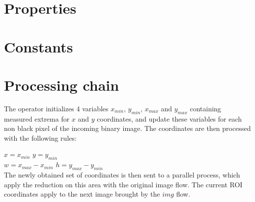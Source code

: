 \documentclass[12pt,a4paper]{article}
\begin{document}
\section*{Properties}

\vspace{0.5cm}

\section*{Constants}



\section*{Processing chain}

The operator initializes 4 variables $x_{min}$, $y_{min}$, $x_{max}$ and $y_{max}$ containing measured extrema for $x$ and $y$ coordinates, and update these variables for each non black pixel of the incoming binary image. The coordinates are then processed with the following rules:

\centering
$x = x_{min}$ \hspace*{2cm} $y = y_{min}$\\
$w = x_{max} - x_{min}$ \hspace*{2cm} $h = y_{max} - y_{min}$\\

The newly obtained set of coordinates is then sent to a parallel process, which apply the reduction on this area with the original image flow. The current ROI coordinates apply to the next image brought by the $img$ flow.
\end{document}
